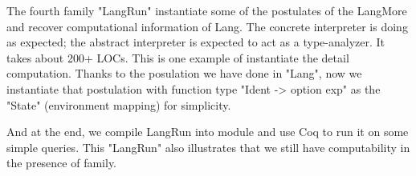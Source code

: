 The fourth family "LangRun" instantiate some of the postulates of the
LangMore and recover computational information of Lang. The concrete
interpreter is doing as expected; the abstract interpreter is expected
to act as a type-analyzer. It takes about 200+ LOCs. This is one example
of instantiate the detail computation. Thanks to the posulation we have done in "Lang", now we instantiate that postulation with function type "Ident -> option exp" as the "State" (environment mapping) for simplicity. 


And at the end, we compile LangRun into module and use Coq to run it on
some simple queries. This "LangRun" also illustrates that we still have
computability in the presence of family.